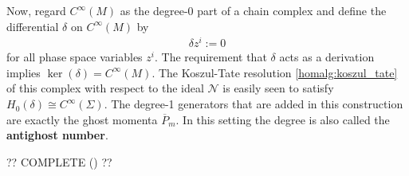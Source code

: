     Now, regard $C^\infty(M)$ as the degree-0 part of a chain complex and define the differential $\delta$ on $C^\infty(M)$ by
    \begin{gather}
        \delta z^i := 0
    \end{gather}
    for all phase space variables $z^i$. The requirement that $\delta$ acts as a derivation implies $\ker(\delta)=C^\infty(M)$. The Koszul-Tate resolution \ref{homalg:koszul_tate} of this complex with respect to the ideal $\mathcal{N}$ is easily seen to satisfy $H_0(\delta)\cong C^\infty(\Sigma)$. The degree-1 generators that are added in this construction are exactly the ghost momenta $\overline{P}_m$. In this setting the degree is also called the \textbf{antighost number}.

    ?? COMPLETE (\cite{henneaux_teitelboim}) ??